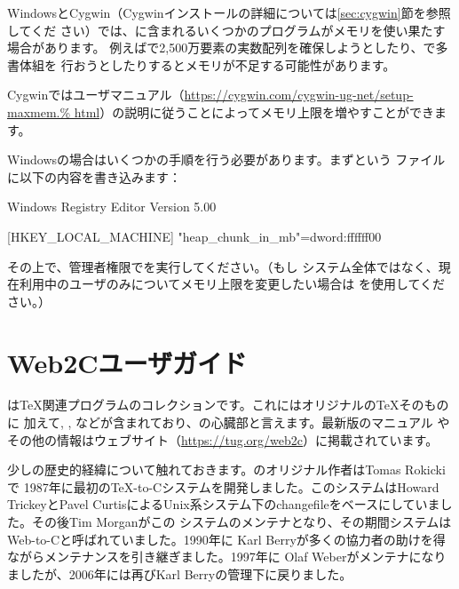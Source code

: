 \documentclass[uplatex,dvipdfmx,12pt,tombow]{jsarticle}
\begin{document}
WindowsとCygwin（Cygwinインストールの詳細については\ref{sec:cygwin}節を参照してくだ
さい）では、\TL に含まれるいくつかのプログラムがメモリを使い果たす場合があります。
例えばで2,500万要素の実数配列を確保しようとしたり、\LuaTeX で多書体組を
行おうとしたりするとメモリが不足する可能性があります。

Cygwinではユーザマニュアル（\url{https://cygwin.com/cygwin-ug-net/setup-maxmem.%
html}）の説明に従うことによってメモリ上限を増やすことができます。

Windowsの場合はいくつかの手順を行う必要があります。まずという
ファイルに以下の内容を書き込みます：
%
\begin{sverbatim}
Windows Registry Editor Version 5.00

[HKEY_LOCAL_MACHINE\Software\Cygwin]
"heap_chunk_in_mb"=dword:ffffff00
\end{sverbatim}
%
その上で、管理者権限でを実行してください。（もし
システム全体ではなく、現在利用中のユーザのみについてメモリ上限を変更したい場合は
を使用してください。）

\section{Web2Cユーザガイド}

\Webc は\TeX 関連プログラムのコレクションです。これにはオリジナルの\TeX そのものに
加えて\MF, \MP, \BibTeX などが含まれており、\TL の心臓部と言えます。最新版のマニュアル
やその他の情報はウェブサイト（\url{https://tug.org/web2c}）に掲載されています。

少し\Webc の歴史的経緯について触れておきます。\Webc のオリジナル作者はTomas Rokickiで
1987年に最初の\TeX -to-Cシステムを開発しました。このシステムはHoward TrickeyとPavel
CurtisによるUnix系システム下のchangefileをベースにしていました。その後Tim Morganがこの
システムのメンテナとなり、その期間システムはWeb-to-Cと呼ばれていました。1990年に
Karl Berryが多くの協力者の助けを得ながらメンテナンスを引き継ぎました。1997年に
Olaf Weberがメンテナになりましたが、2006年には再びKarl Berryの管理下に戻りました。
\end{document}
